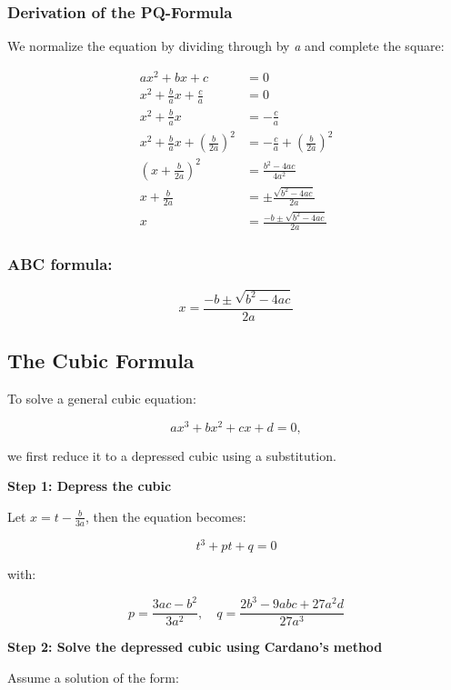 \subsubsection{Derivation of the PQ-Formula}

We normalize the equation by dividing through by \emph{a} and complete the square:

\begin{align*}
    ax^2 + bx + c &= 0 \\
    x^2 + \frac{b}{a}x + \frac{c}{a} &= 0 \\
    x^2 + \frac{b}{a}x &= -\frac{c}{a} \\
    x^2 + \frac{b}{a}x + {\left(\frac{b}{2a}\right)}^2 &= -\frac{c}{a} + {\left(\frac{b}{2a}\right)}^2 \\
    {\left(x + \frac{b}{2a}\right)}^2 &= \frac{b^2 - 4ac}{4a^2} \\
    x + \frac{b}{2a} &= \pm \frac{\sqrt{b^2 - 4ac}}{2a} \\
    x &= \frac{-b \pm \sqrt{b^2 - 4ac}}{2a}
\end{align*}

\subsubsection{ABC formula:}

\[
    x = \frac{-b \pm \sqrt{b^2 - 4ac}}{2a}
\]

\subsection{The Cubic Formula}

To solve a general cubic equation:

\[
    ax^3 + bx^2 + cx + d = 0,
\]

we first reduce it to a depressed cubic using a substitution.
\vspace{\baselineskip}

\textbf{Step 1: Depress the cubic}

Let \(x = t - \frac{b}{3a}\), then the equation becomes:

\[
    t^3 + pt + q = 0
\]

with:

\[
    p = \frac{3ac - b^2}{3a^2}, \quad q = \frac{2b^3 - 9abc + 27a^2d}{27a^3}
\]

\textbf{Step 2: Solve the depressed cubic using Cardano’s method}

Assume a solution of the form:

